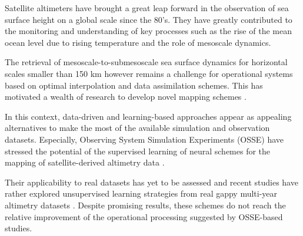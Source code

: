 \documentclass[draft]{agujournal2019}
\begin{document}







  Satellite altimeters have brought a great leap forward in the observation of sea surface height on a global scale since the 80's. They have greatly contributed to the monitoring and understanding of key processes such as the rise of the mean ocean level due to rising temperature and the role of mesoscale dynamics.
  
  The retrieval of mesoscale-to-submesoscale sea surface dynamics for horizontal scales smaller than 150 km however remains a challenge for operational systems based on optimal interpolation \cite{taburetDUACSDT2018252019} and data assimilation \cite{jean-michelCopernicusGlobal122021} schemes. This has motivated a wealth of research to develop novel mapping schemes \cite{ballarottaDynamicMappingAlongTrack2020,ubelmannReconstructingOceanSurface2021,guillouMappingAltimetryForthcoming2021}.

  In this context, data-driven and learning-based approaches \cite{alveraazcarateReconstructionIncompleteOceanographic2005,barthDINCAEMultivariateConvolutional2022,lguensatAnalogDataAssimilation2017,fabletENDTOENDPHYSICSINFORMEDREPRESENTATION2021,martinSynthesizingSeaSurface2023} appear as appealing alternatives to make the most of the available simulation and observation datasets. Especially, Observing System Simulation Experiments (OSSE) have stressed the potential of the supervised learning of neural schemes for the mapping of satellite-derived altimetry data \cite{fabletENDTOENDPHYSICSINFORMEDREPRESENTATION2021,beauchamp4DVarNetSSHEndtoendLearning2023}. 
  
  Their applicability to real datasets has yet to be assessed and recent studies have rather explored unsupervised learning strategies from real gappy multi-year altimetry datasets \cite{martinSynthesizingSeaSurface2023}. Despite promising results, these schemes do not reach the relative improvement of the operational processing suggested by OSSE-based studies.
  
\end{document}

